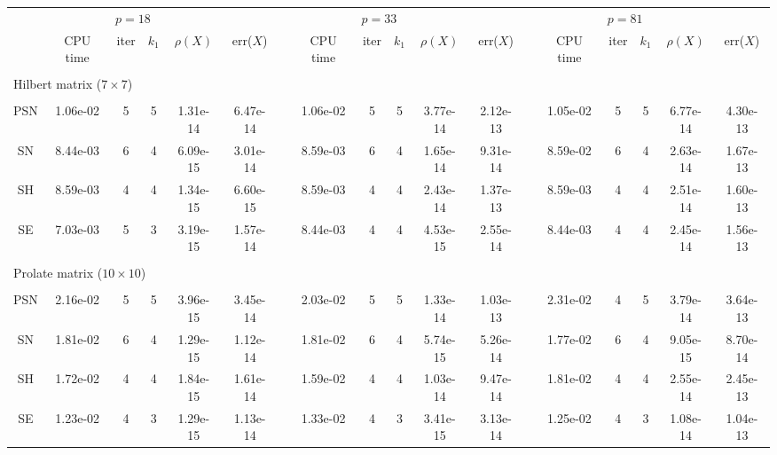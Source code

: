 \begin{landscape}
\begin{table}
\begin{center}
\begin{tabular}{cccccccccccccccccc}
\hline
& \multicolumn{4}{c}{$p = 18$} &&& \multicolumn{4}{c}{$p = 33$} &&& \multicolumn{4}{c}{$p = 81$}\\
\cline{2-6} \cline{8-12} \cline{14-18}
& CPU time & iter & $k_1$ & $\rho(X)$ & err($X$)&& CPU time & iter & $k_1$ & $\rho(X)$ & err($X$) && CPU time & iter & $k_1$ & $\rho(X)$ & err($X$)\\
\hline
 \\
 \multicolumn{6}{l}{Hilbert matrix ($7 \times 7$)} \\
 \\
PSN & 1.06e-02 & 5 & 5 & 1.31e-14 & 6.47e-14 & & 1.06e-02 & 5 & 5 & 3.77e-14 & 2.12e-13 && 1.05e-02 & 5 & 5 & 6.77e-14 & 4.30e-13\\
SN & 8.44e-03 & 6 & 4 & 6.09e-15 & 3.01e-14 & & 8.59e-03 & 6 & 4 & 1.65e-14 & 9.31e-14 && 8.59e-02 & 6 & 4 & 2.63e-14 & 1.67e-13\\
SH & 8.59e-03 & 4 & 4 & 1.34e-15 & 6.60e-15 & & 8.59e-03 & 4 & 4 & 2.43e-14 & 1.37e-13 && 8.59e-03 & 4 & 4 & 2.51e-14 & 1.60e-13\\
SE & 7.03e-03 & 5 & 3 & 3.19e-15 & 1.57e-14 & & 8.44e-03 & 4 & 4 & 4.53e-15 & 2.55e-14 && 8.44e-03 & 4 & 4 & 2.45e-14 & 1.56e-13\\
 \\
\multicolumn{6}{l}{Prolate matrix ($10 \times 10$)}\\
 \\
PSN & 2.16e-02 & 5 & 5 & 3.96e-15 & 3.45e-14 & & 2.03e-02 & 5 & 5 & 1.33e-14 & 1.03e-13 && 2.31e-02 & 4 & 5 & 3.79e-14 & 3.64e-13\\
SN & 1.81e-02 & 6 & 4 & 1.29e-15 & 1.12e-14 & & 1.81e-02 & 6 & 4 & 5.74e-15 & 5.26e-14 && 1.77e-02 & 6 & 4 & 9.05e-15 & 8.70e-14\\
SH & 1.72e-02 & 4 & 4 & 1.84e-15 & 1.61e-14 & & 1.59e-02 & 4 & 4 & 1.03e-14 & 9.47e-14 && 1.81e-02 & 4 & 4 & 2.55e-14 & 2.45e-13\\
SE & 1.23e-02 & 4 & 3 & 1.29e-15 & 1.13e-14 & & 1.33e-02 & 4 & 3 & 3.41e-15 & 3.13e-14 && 1.25e-02 & 4 & 3 & 1.08e-14 & 1.04e-13\\

\end{tabular}
\end{center}
\end{table}
\end{landscape}
